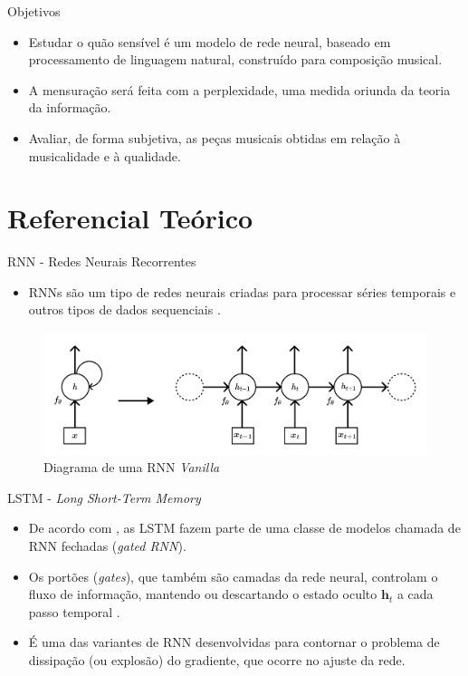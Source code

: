 \documentclass[xcolor=table]{beamer}
\newcommand{\bs}[1]{\boldsymbol{#1}}
\begin{document}
    \begin{frame}{Objetivos}
        \begin{itemize}
            \justifying
            \item Estudar o quão sensível é um modelo de rede neural, baseado em processamento de linguagem natural, construído para composição musical.
            \item A mensuração será feita com a perplexidade, uma medida oriunda da teoria da informação.
            \item Avaliar, de forma subjetiva, as peças musicais obtidas em relação à musicalidade e à qualidade.
        \end{itemize}
    \end{frame}



\section{Referencial Teórico}
    \begin{frame}{RNN - Redes Neurais Recorrentes}
        \begin{itemize}
            \item RNNs são um tipo de redes neurais criadas para processar séries temporais e outros tipos de dados sequenciais \citep{fan2021}.
        \end{itemize}
        \begin{figure}
           \includegraphics[scale=0.3]{figuras/rnn_hidden_state.pdf}
		    \caption{Diagrama de uma RNN \textit{Vanilla} \citep[adaptado de][]{goodfellow2016, kamath2019}}
	    \end{figure}
    \end{frame}

    \begin{frame}{LSTM - \textit{Long Short-Term Memory}}
        \begin{itemize}
            \justifying
            \item De acordo com \citet{goodfellow2016}, as LSTM fazem parte de uma classe de modelos chamada de RNN fechadas (\textit{gated RNN}).
            \item Os portões (\textit{gates}), que também são camadas da rede neural, controlam o fluxo de informação, mantendo ou descartando o estado oculto $\bs{h}_{t}$ a cada passo temporal \citep{kamath2019}.
            \item É uma das variantes de RNN desenvolvidas para contornar o problema de dissipação (ou explosão) do gradiente, que ocorre no ajuste da rede.
        \end{itemize}  
    \end{frame}
    
\end{document}
